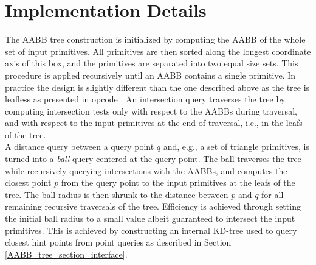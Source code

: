 \section{Implementation Details}
\label{AABB_tree_section_details}

The AABB tree construction is initialized by computing the AABB of the whole set of input primitives. All primitives are then sorted along the longest coordinate axis of this box, and the primitives are separated into two equal size sets. This procedure is applied recursively until an AABB contains a single primitive. In practice the design is slightly different than the one described above as the tree is leafless as presented in {\sc opcode} \cite{cgal:t-ocdl-05}.
An intersection query traverses the tree by computing intersection tests only with respect to the AABBs during traversal, and with respect to the input primitives at the end of traversal, i.e., in the leafs of the tree.\\

A distance query between a query point $q$ and, e.g., a set of triangle primitives, is turned into a \emph{ball} query centered at the query point. The ball traverses the tree while recursively querying intersections with the AABBs, and computes the closest point $p$ from the query point to the input primitives at the leafs of the tree. The ball radius is then shrunk to the distance between $p$ and $q$ for all remaining recursive traversals of the tree. Efficiency is achieved through setting the initial ball radius to a small value albeit guaranteed to intersect the input primitives. This is achieved by constructing an internal KD-tree used to query closest hint points from point queries as described in Section \ref{AABB_tree_section_interface}.
